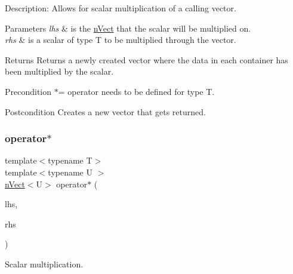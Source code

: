 Description\+: Allows for scalar multiplication of a calling vector. 
\begin{DoxyParams}{Parameters}
{\em lhs} & is the \hyperlink{classnVect}{n\+Vect} that the scalar will be multiplied on. \\
\hline
{\em rhs} & is a scalar of type T to be multiplied through the vector. \\
\hline
\end{DoxyParams}
\begin{DoxyReturn}{Returns}
Returns a newly created vector where the data in each container has been multiplied by the scalar. 
\end{DoxyReturn}
\begin{DoxyPrecond}{Precondition}
$\ast$= operator needs to be defined for type T. 
\end{DoxyPrecond}
\begin{DoxyPostcond}{Postcondition}
Creates a new vector that gets returned. 
\end{DoxyPostcond}
\mbox{\label{classnVect_a9673bd479b1647b3f4ed8a68b1b793a9}} 
\subsubsection{\texorpdfstring{operator$\ast$}{operator*}\hspace{0.1cm}{\footnotesize\ttfamily [2/2]}}
{\footnotesize\ttfamily template$<$typename T$>$ \\
template$<$typename U $>$ \\
\hyperlink{classnVect}{n\+Vect}$<$U$>$ operator$\ast$ (\begin{DoxyParamCaption}\item[{const U \&}]{lhs,  }\item[{const \hyperlink{classnVect}{n\+Vect}$<$ U $>$ \&}]{rhs }\end{DoxyParamCaption})\hspace{0.3cm}{\ttfamily [friend]}}



Scalar multiplication. 

